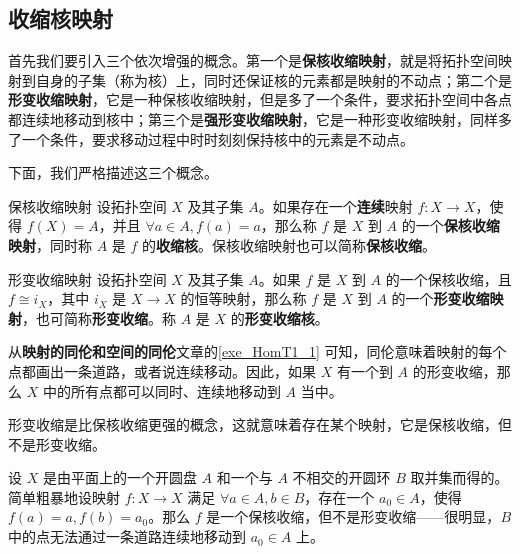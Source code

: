 

\subsection{收缩核映射}

首先我们要引入三个依次增强的概念。第一个是\textbf{保核收缩映射}，就是将拓扑空间映射到自身的子集（称为核）上，同时还保证核的元素都是映射的不动点；第二个是\textbf{形变收缩映射}，它是一种保核收缩映射，但是多了一个条件，要求拓扑空间中各点都连续地移动到核中；第三个是\textbf{强形变收缩映射}，它是一种形变收缩映射，同样多了一个条件，要求移动过程中时时刻刻保持核中的元素是不动点。

下面，我们严格描述这三个概念。

\begin{definition}{保核收缩映射}
设拓扑空间 $X$ 及其子集 $A$。如果存在一个\textbf{连续}映射 $f:X\rightarrow X$，使得 $f(X)=A$，并且 $\forall a\in A, f(a)=a$，那么称 $f$ 是 $X$ 到 $A$ 的一个\textbf{保核收缩映射}，同时称 $A$ 是 $f$ 的\textbf{收缩核}。保核收缩映射也可以简称\textbf{保核收缩}。
\end{definition}

\begin{definition}{形变收缩映射}
设拓扑空间 $X$ 及其子集 $A$。如果 $f$ 是 $X$ 到 $A$ 的一个保核收缩，且 $f\cong i_X$，其中 $i_X$ 是 $X\rightarrow X$ 的恒等映射，那么称 $f$ 是 $X$ 到 $A$ 的一个\textbf{形变收缩映射}，也可简称\textbf{形变收缩}。称 $A$ 是 $X$ 的\textbf{形变收缩核}。
\end{definition}

从\textbf{映射的同伦和空间的同伦}文章的\autoref{exe_HomT1_1} 可知，同伦意味着映射的每个点都画出一条道路，或者说连续移动。因此，如果 $X$ 有一个到 $A$ 的形变收缩，那么 $X$ 中的所有点都可以同时、连续地移动到 $A$ 当中。

形变收缩是比保核收缩更强的概念，这就意味着存在某个映射，它是保核收缩，但不是形变收缩。

\begin{example}{}
设 $X$ 是由平面上的一个开圆盘 $A$ 和一个与 $A$ 不相交的开圆环 $B$ 取并集而得的。简单粗暴地设映射 $f:X\rightarrow X$ 满足 $\forall a\in A, b\in B$，存在一个 $a_0\in A$，使得 $f(a)=a, f(b)=a_0$。那么 $f$ 是一个保核收缩，但不是形变收缩——很明显，$B$ 中的点无法通过一条道路连续地移动到 $a_0\in A$ 上。
\end{example}

